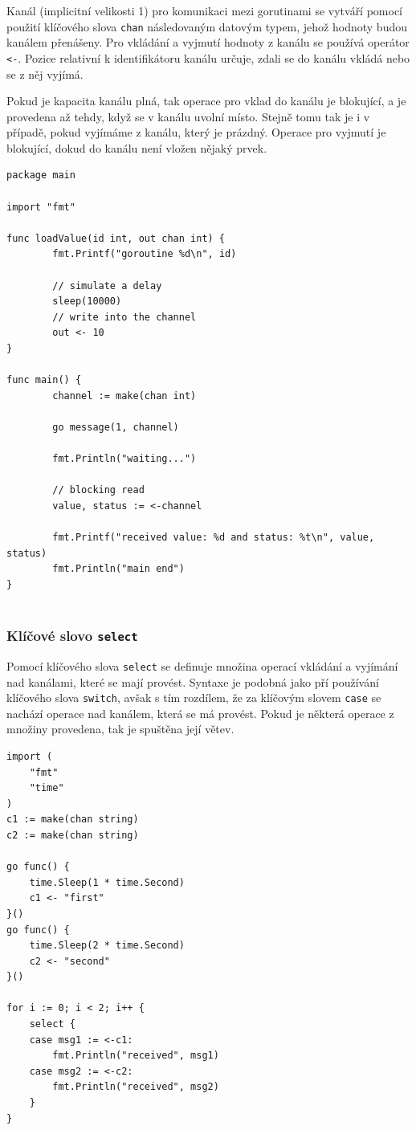 \documentclass[12pt, a4paper]{article}
\begin{document}
Kanál (implicitní velikosti 1) pro komunikaci mezi gorutinami se vytváří pomocí použití klíčového slova \texttt{chan} následovaným datovým typem, jehož hodnoty budou kanálem přenášeny. Pro vkládání a vyjmutí hodnoty z kanálu se používá operátor \texttt{<-}. Pozice relativní k identifikátoru kanálu určuje, zdali se do kanálu vkládá nebo se z něj vyjímá.

Pokud je kapacita kanálu plná, tak operace pro vklad do kanálu je blokující, a je provedena až tehdy, když se v kanálu uvolní místo. Stejně tomu tak je i v případě, pokud vyjímáme z kanálu, který je prázdný. Operace pro vyjmutí je blokující, dokud do kanálu není vložen nějaký prvek.

\begin{lstlisting}[caption={Využití kanálu}, captionpos=b, language=Golang]
package main
 
import "fmt"
 
func loadValue(id int, out chan int) {
        fmt.Printf("goroutine %d\n", id)
 
        // simulate a delay
        sleep(10000)
        // write into the channel 
        out <- 10
}
 
func main() {
        channel := make(chan int)
 
        go message(1, channel)
 
        fmt.Println("waiting...")
 
        // blocking read 
        value, status := <-channel
 
        fmt.Printf("received value: %d and status: %t\n", value, status)
        fmt.Println("main end")
}


\end{lstlisting}

\subsubsection{Klíčové slovo \texttt{select}}

Pomocí klíčového slova \texttt{select} se definuje množina operací vkládání a vyjímání nad kanálami, které se mají provést. Syntaxe je podobná jako pří používání klíčového slova \texttt{switch}, avšak s tím rozdílem, že za klíčovým slovem \texttt{case} se nachází operace nad kanálem, která se má provést. Pokud je některá operace z množiny provedena, tak je spuštěna její větev.


\begin{lstlisting}[caption={Klíčové slovo \texttt{select}}, captionpos=b, language=Golang]
import (
    "fmt"
    "time"
)
c1 := make(chan string)
c2 := make(chan string)

go func() {
    time.Sleep(1 * time.Second)
    c1 <- "first"
}()
go func() {
    time.Sleep(2 * time.Second)
    c2 <- "second"
}()

for i := 0; i < 2; i++ {
    select {
    case msg1 := <-c1:
        fmt.Println("received", msg1)
    case msg2 := <-c2:
        fmt.Println("received", msg2)
    }
}
\end{lstlisting}
\end{document}
